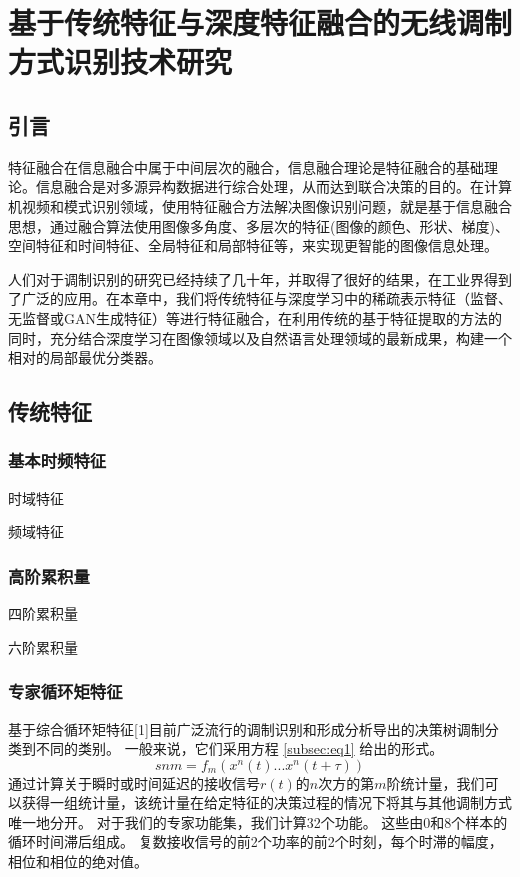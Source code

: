 
\chapter{基于传统特征与深度特征融合的无线调制方式识别技术研究}
\section{引言}
特征融合在信息融合中属于中间层次的融合，信息融合理论是特征融合的基础理论。信息融合是对多源异构数据进行综合处理，从而达到联合决策的目的。在计算机视频和模式识别领域，使用特征融合方法解决图像识别问题，就是基于信息融合思想，通过融合算法使用图像多角度、多层次的特征(图像的颜色、形状、梯度)、空间特征和时间特征、全局特征和局部特征等，来实现更智能的图像信息处理。\par

人们对于调制识别的研究已经持续了几十年，并取得了很好的结果，在工业界得到了广泛的应用。在本章中，我们将传统特征与深度学习中的稀疏表示特征（监督、无监督或GAN生成特征）等进行特征融合，在利用传统的基于特征提取的方法的同时，充分结合深度学习在图像领域以及自然语言处理领域的最新成果，构建一个相对的局部最优分类器。\par

\section{传统特征}
\subsection{基本时频特征}
时域特征\par

频域特征\par

\subsection{高阶累积量}
四阶累积量\par

六阶累积量\par

\subsection{专家循环矩特征}
基于综合循环矩特征[1]目前广泛流行的调制识别和形成分析导出的决策树调制分类到不同的类别。 一般来说，它们采用方程 \ref{subsec:eq1} 给出的形式。
\begin{equation}
	\label{subsec:eq1}
	snm = f_{m}(x^{n}(t)...x^{n}(t + \tau))
\end{equation}
通过计算关于瞬时或时间延迟的接收信号$r(t)$的$n$次方的第$m$阶统计量，我们可以获得一组统计量，该统计量在给定特征的决策过程的情况下将其与其他调制方式唯一地分开。 对于我们的专家功能集，我们计算32个功能。 这些由0和8个样本的循环时间滞后组成。 复数接收信号的前2个功率的前2个时刻，每个时滞的幅度，相位和相位的绝对值。\par

